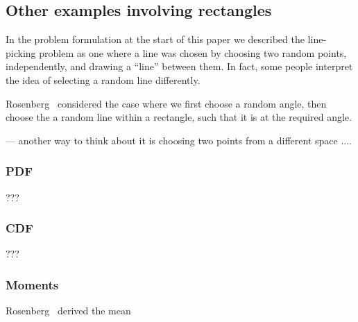 \subsection{Other examples involving rectangles}
\label{sec:rect_other}

In the problem formulation at the start of this paper we described the
line-picking problem as one where a line was chosen by choosing two
random points, independently, and drawing a ``line'' between them.  In
fact, some people interpret the idea of selecting a random line
differently.

Rosenberg~\cite{Rosenberg200499} considered the case where we first
choose a random angle, then choose the a random line within a
rectangle, such that it is at the required angle. 




 --- another way to think about it is choosing two points from a
 different space ....



\subsubsection{PDF}

???

\subsubsection{CDF}

???

\subsubsection{Moments}

Rosenberg~\cite{Rosenberg200499} derived the mean


